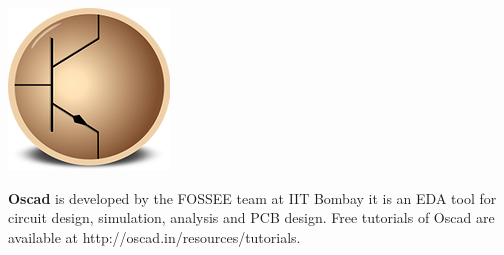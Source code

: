 \documentclass{letter}
\begin{document}
\begin{minipage}[t]{0.5\linewidth}
    \begin{center}
        \includegraphics[width=0.35\linewidth]{images/oscad_logo.png}
    \end{center}
\textbf{Oscad} is developed by the FOSSEE team at IIT Bombay it is an EDA tool 
for circuit design, simulation, analysis and PCB design. Free tutorials of Oscad 
are available at http://oscad.in/resources/tutorials.
\end{minipage}
\end{document}
